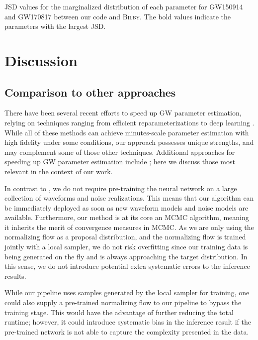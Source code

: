 \documentclass[twocolumn]{aastex631}
\begin{document}
\begin{table}[hbt!]
    \begin{center}
    \caption{JSD values for the marginalized distribution of each parameter for
    GW150914 and GW170817 between our code and \textsc{Bilby}. The bold values
    indicate the parameters with the largest JSD.}
    \label{tab:JSD}
    \end{center}
\end{table}

\section{Discussion}
\label{sec: Discussion}

\subsection{Comparison to other approaches}

There have been several recent efforts to speed up GW parameter estimation,
relying on techniques ranging from efficient reparameterizations
\citep{Islam:2022afg,Roulet:2022kot} to deep learning
\citep{Dax:2021tsq,Dax:2022pxd}. While all of these methods can achieve
minutes-scale parameter estimation with high fidelity under some conditions,
our approach possesses unique strengths, and may complement some of those other
techniques. Additional approaches for speeding up GW parameter estimation include
\cite{Canizares:2014fya,Smith:2016qas,Lee:2022jpn,Wofford:2022ykb,Lange:2018pyp,Williams:2021qyt,Morisaki:2021ngj};
here we discuss those most relevant in the context of our work.

In contrast to \cite{Dax:2021tsq,Dax:2022pxd}, we do not require pre-training
the neural network on a large collection of waveforms and noise realizations.
This means that our algorithm can be immediately deployed as soon as new
waveform models and noise models are available. Furthermore, our method is at
its core an MCMC algorithm, meaning it inherits the merit of convergence
measures in MCMC. As we are only using the normalizing flow as a proposal
distribution, and the normalizing flow is trained jointly with a local sampler,
we do not risk overfitting since our training data is being generated on the
fly and is always approaching the target distribution. In this sense, we do not
introduce potential extra systematic errors to the inference results.

While our pipeline uses samples generated by the local sampler for training,
one could also supply a pre-trained normalizing flow to our pipeline to bypass
the training stage. This would have the advantage of further reducing the total
runtime; however, it could introduce systematic bias in the inference result if
the pre-trained network is not able to capture the complexity presented in the
data.
\end{document}
